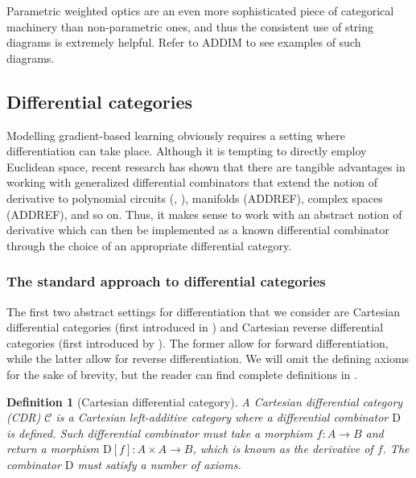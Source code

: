 \documentclass[12pt,a4paper,openright,twoside]{report}
\theoremstyle{plain}
\newtheorem{definition}[proposition]{Definition}
\theoremstyle{definition}
\begin{document}
Parametric weighted optics are an even more sophisticated piece of categorical machinery than non-parametric ones, and thus the consistent use of string diagrams is extremely helpful. Refer to ADDIM to see examples of such diagrams.





\subsection{Differential categories}
\label{subsec: diffcats}


Modelling gradient-based learning obviously requires a setting where differentiation can take place. Although it is tempting to directly employ Euclidean space, recent research has shown that there are tangible advantages in working with generalized differential combinators that extend the notion of derivative to polynomial circuits (\cite{wilson2022categories}, \cite{wilson2021reverse}), manifolds (ADDREF), complex spaces (ADDREF), and so on. 
Thus, it makes sense to work with an abstract notion of derivative which can then be implemented as a known differential combinator through the choice of an appropriate differential category.


\subsubsection{The standard approach to differential categories}


The first two abstract settings for differentiation that we consider are Cartesian differential categories (first introduced in \cite{blute2006differential}) and Cartesian reverse differential categories (first introduced by \cite{cockett2019reverse}). The former allow for forward differentiation, while the latter allow for reverse differentiation. We will omit the defining axioms for the sake of brevity, but the reader can find complete definitions in \cite{cockett2019reverse}.

\begin{definition}[Cartesian differential category]
  A Cartesian differential category (CDR) $\mathcal{C}$ is a Cartesian left-additive category where a differential combinator $\mathrm{D}$ is defined. Such differential combinator must take a morphism $f: A \to B$ and return a morphism $\mathrm{D}[f]: A \times A \to B$, which is known as the derivative of $f$. The combinator $\mathrm{D}$ must satisfy a number of axioms. 
\end{definition}
\end{document}

